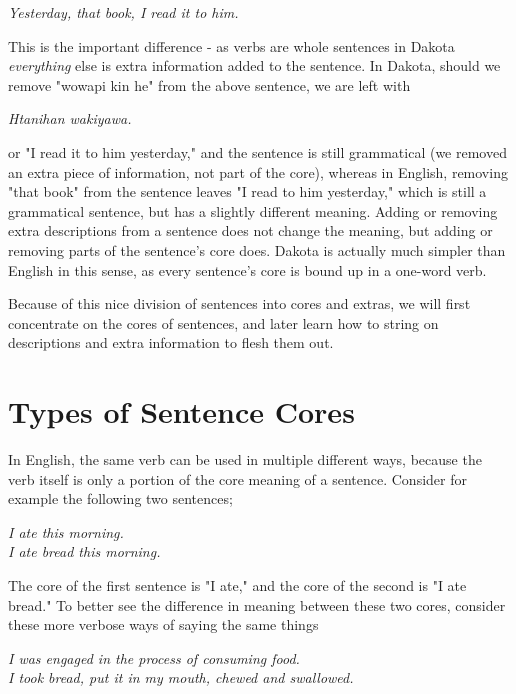 \documentclass[10pt,letter]{article} %
\begin{document}
\begin{center}
\emph{Yesterday, that book, I read it to him.}
\end{center}

This is the important difference - as verbs are whole sentences in Dakota \emph{everything} else is extra information added to the sentence. In Dakota, should we remove "wowapi kin he" from the above sentence, we are left with

\begin{center}
\emph{Htanihan wakiyawa.}
\end{center}

or "I read it to him yesterday," and the sentence is still grammatical (we removed an extra piece of information, not part of the core), whereas in English, removing "that book" from the sentence leaves "I read to him yesterday," which is still a grammatical sentence, but has a slightly different meaning.  Adding or removing extra descriptions from a sentence does not change the meaning, but adding or removing parts of the sentence's core does.  Dakota is actually much simpler than English in this sense, as every sentence's core is bound up in a one-word verb.

Because of this nice division of sentences into cores and extras, we will first concentrate on the cores of sentences, and later learn how to string on descriptions and extra information to flesh them out.


    \section{Types of Sentence Cores}

In English, the same verb can be used in multiple different ways, because the verb itself is only a portion of the core meaning of a sentence.  Consider for example the following two sentences;

\begin{center}
\emph{I ate this morning.}\\
\emph{I ate bread this morning.}
\end{center}

The core of the first sentence is "I ate," and the core of the second is "I ate bread."  To better see the difference in meaning between these two cores, consider these more verbose ways of saying the same things

\begin{center}
\emph{I was engaged in the process of consuming food.}\\
\emph{I took bread, put it in my mouth, chewed and swallowed.}
\end{center}
\end{document}

